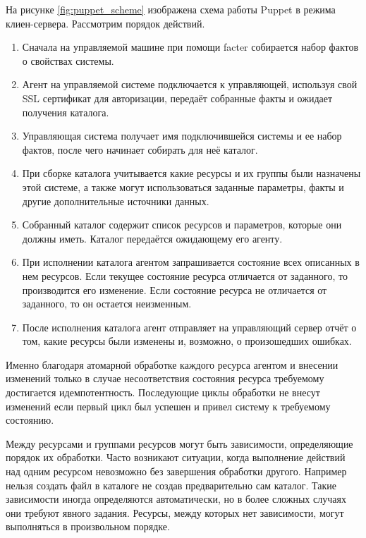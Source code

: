 На рисунке \ref{fig:puppet_scheme} изображена схема работы Puppet в режима клиен-сервера. Рассмотрим порядок действий.
\begin{enumerate}
\item Сначала на управляемой машине при помощи facter собирается набор фактов о свойствах системы.
\item Агент на управляемой системе подключается к управляющей, используя свой SSL сертификат для авторизации, передаёт собранные факты и ожидает получения каталога.
\item Управляющая система получает имя подключившейся системы и ее набор фактов, после чего начинает собирать для неё каталог.
\item При сборке каталога учитывается какие ресурсы и их группы были назначены этой системе, а также могут использоваться заданные параметры, факты и другие дополнительные источники данных.
\item Собранный каталог содержит список ресурсов и параметров, которые они должны иметь. Каталог передаётся ожидающему его агенту.
\item При исполнении каталога агентом запрашивается состояние всех описанных в нем ресурсов. Если текущее состояние ресурса отличается от заданного, то производится его изменение. Если состояние ресурса не отличается от заданного, то он остается неизменным.
\item После исполнения каталога агент отправляет на управляющий сервер отчёт о том, какие ресурсы были изменены и, возможно, о произошедших ошибках.
\end{enumerate}

Именно благодаря атомарной обработке каждого ресурса агентом и внесении изменений только в случае несоответствия состояния ресурса требуемому достигается идемпотентность. Последующие циклы обработки не внесут изменений если первый цикл был успешен и привел систему к требуемому состоянию.

Между ресурсами и группами ресурсов могут быть зависимости, определяющие порядок их обработки. Часто возникают ситуации, когда выполнение действий над одним ресурсом невозможно без завершения обработки другого. Например нельзя создать файл в каталоге не создав предварительно сам каталог. Такие зависимости иногда определяются автоматически, но в более сложных случаях они требуют явного задания. Ресурсы, между которых нет зависимости, могут выполняться в произвольном порядке.
